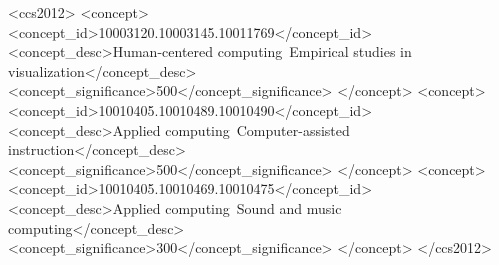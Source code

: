 \begin{CCSXML}
<ccs2012>
   <concept>
       <concept_id>10003120.10003145.10011769</concept_id>
       <concept_desc>Human-centered computing~Empirical studies in visualization</concept_desc>
       <concept_significance>500</concept_significance>
       </concept>
    <concept>
       <concept_id>10010405.10010489.10010490</concept_id>
       <concept_desc>Applied computing~Computer-assisted instruction</concept_desc>
       <concept_significance>500</concept_significance>
       </concept>
   <concept>
       <concept_id>10010405.10010469.10010475</concept_id>
       <concept_desc>Applied computing~Sound and music computing</concept_desc>
       <concept_significance>300</concept_significance>
       </concept>
 </ccs2012>
\end{CCSXML}




